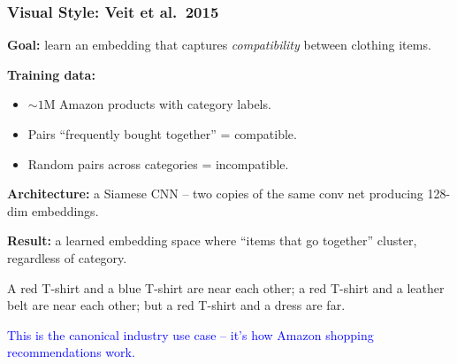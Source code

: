 \documentclass[notes,11pt, aspectratio=169]{beamer}
\begin{document}
\begin{frame}
\frametitle{Visual Style: Veit et al.\ 2015}

\textbf{Goal:} learn an embedding that captures \emph{compatibility} between clothing items.

\vspace{6pt}
\textbf{Training data:}
\begin{itemize}
    \item $\sim 1$M Amazon products with category labels.
    \item Pairs ``frequently bought together'' = compatible.
    \item Random pairs across categories = incompatible.
\end{itemize}

\vspace{8pt}
\textbf{Architecture:} a Siamese CNN -- two copies of the same conv net producing 128-dim embeddings.

\vspace{6pt}
\textbf{Result:} a learned embedding space where ``items that go together'' cluster, regardless of category.

\vspace{4pt}
A red T-shirt and a blue T-shirt are near each other; a red T-shirt and a leather belt are near each other; but a red T-shirt and a dress are far.

\vspace{4pt}
\textcolor{blue}{This is the canonical industry use case -- it's how Amazon shopping recommendations work.}
\end{frame}
\end{document}

